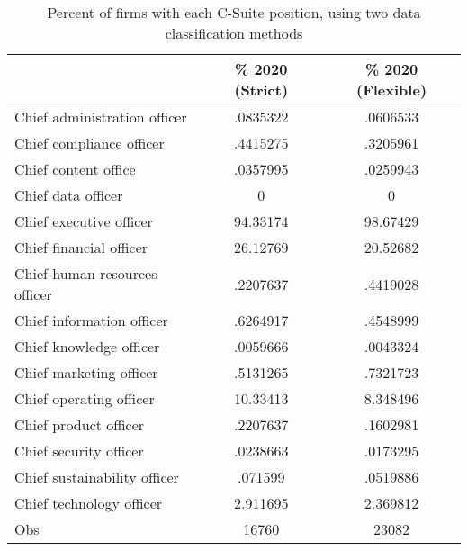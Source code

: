 \begin{table}[htbp]\centering
\caption{Percent of firms with each C-Suite position, using two data classification methods\label{tab98}}
\begin{tabular}{l*{2}{c}}
\toprule
                    &\% 2020 (Strict)&\% 2020 (Flexible)\\
\midrule
Chief administration officer&    .0835322&    .0606533\\
Chief compliance officer&    .4415275&    .3205961\\
Chief content office&    .0357995&    .0259943\\
Chief data officer  &           0&           0\\
Chief executive officer&    94.33174&    98.67429\\
Chief financial officer&    26.12769&    20.52682\\
Chief human resources officer&    .2207637&    .4419028\\
Chief information officer&    .6264917&    .4548999\\
Chief knowledge officer&    .0059666&    .0043324\\
Chief marketing officer&    .5131265&    .7321723\\
Chief operating officer&    10.33413&    8.348496\\
Chief product officer&    .2207637&    .1602981\\
Chief security officer&    .0238663&    .0173295\\
Chief sustainability officer&     .071599&    .0519886\\
Chief technology officer&    2.911695&    2.369812\\
Obs                 &       16760&       23082\\
\bottomrule
\end{tabular}
\end{table}
